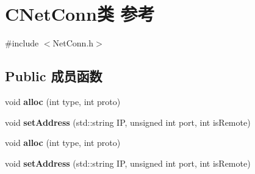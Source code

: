 \hypertarget{class_c_net_conn}{}\section{C\+Net\+Conn类 参考}
\label{class_c_net_conn}


{\ttfamily \#include $<$Net\+Conn.\+h$>$}

\subsection*{Public 成员函数}
\begin{DoxyCompactItemize}
\item 
\mbox{\label{class_c_net_conn_acbae5bdb550ed916cfaedf6ec0caa8de}} 
void {\bfseries alloc} (int type, int proto)
\item 
\mbox{\label{class_c_net_conn_a9157b83f4f5d149487dadba775e53fa3}} 
void {\bfseries set\+Address} (std\+::string IP, unsigned int port, int is\+Remote)
\item 
\mbox{\label{class_c_net_conn_acbae5bdb550ed916cfaedf6ec0caa8de}} 
void {\bfseries alloc} (int type, int proto)
\item 
\mbox{\label{class_c_net_conn_a9157b83f4f5d149487dadba775e53fa3}} 
void {\bfseries set\+Address} (std\+::string IP, unsigned int port, int is\+Remote)
\end{DoxyCompactItemize}
